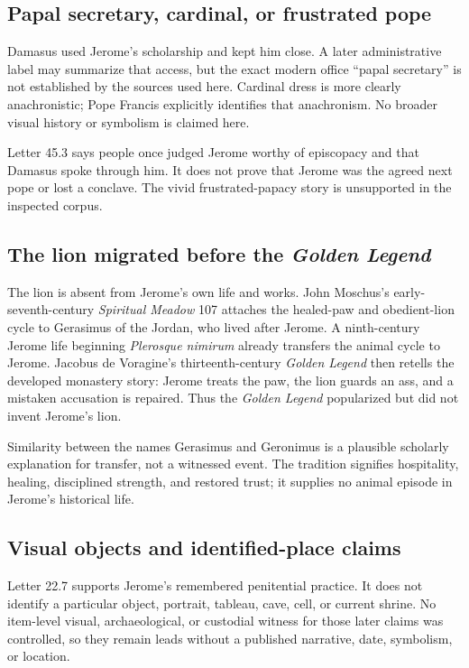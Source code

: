 \subsection{Papal secretary, cardinal, or frustrated pope}

Damasus used Jerome's scholarship and kept him close. A later administrative
label may summarize that access, but the exact modern office ``papal
secretary'' is not established by the sources used here. Cardinal dress is
more clearly anachronistic; Pope Francis explicitly identifies that
anachronism. No broader visual history or symbolism is claimed here.

Letter 45.3 says people once judged Jerome worthy of episcopacy and that
Damasus spoke through him. It does not prove that Jerome was the agreed next
pope or lost a conclave. The vivid frustrated-papacy story is unsupported in
the inspected corpus.

\subsection{The lion migrated before the \emph{Golden Legend}}

The lion is absent from Jerome's own life and works. John Moschus's
early-seventh-century \emph{Spiritual Meadow} 107 attaches the healed-paw and
obedient-lion cycle to Gerasimus of the Jordan, who lived after Jerome. A
ninth-century Jerome life beginning \emph{Plerosque nimirum} already transfers
the animal cycle to Jerome. Jacobus de Voragine's thirteenth-century
\emph{Golden Legend} then retells the developed monastery story: Jerome treats
the paw, the lion guards an ass, and a mistaken accusation is repaired. Thus
the \emph{Golden Legend} popularized but did not invent Jerome's lion.

Similarity between the names Gerasimus and Geronimus is a plausible scholarly
explanation for transfer, not a witnessed event. The tradition signifies
hospitality, healing, disciplined strength, and restored trust; it supplies no
animal episode in Jerome's historical life.

\subsection{Visual objects and identified-place claims}

Letter 22.7 supports Jerome's remembered penitential practice. It does not
identify a particular object, portrait, tableau, cave, cell, or current shrine.
No item-level visual, archaeological, or custodial witness for those later
claims was controlled, so they remain leads without a published narrative,
date, symbolism, or location.

